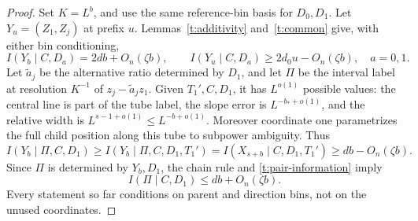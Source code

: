 \begin{proof}
Set $K=L^b$, and use the same reference-bin basis for $D_0,D_1$.
Let $Y_u=(Z_1,Z_j)$ at prefix $u$.  Lemmas~\ref{t:additivity}
and~\ref{t:common} give, with either bin conditioning,
\begin{equation}\label{t:pair-information}
 I(Y_b\mid C,D_a)=2db+O_n(\zeta b),\qquad
 I(Y_u\mid C,D_a)\ge2d_0u-O_n(\zeta b),\quad a=0,1.
\end{equation}
Let $\widetilde a_j$ be the alternative ratio determined by $D_1$,
and let $\Pi$ be the interval label at resolution $K^{-1}$ of
$z_j-\widetilde a_jz_1$.  Given $T_1',C,D_1$, it has $L^{o(1)}$
possible values: the central line is part of the tube label, the slope
error is $L^{-b_*+o(1)}$, and the relative width is
$L^{s-1+o(1)}\le L^{-b+o(1)}$.  Moreover coordinate one parametrizes
the full child position along this tube to subpower ambiguity.  Thus
\[
 I(Y_b\mid\Pi,C,D_1)
 \ge I(Y_b\mid\Pi,C,D_1,T_1')
 =I(X_{s+b}\mid C,D_1,T_1')
 \ge db-O_n(\zeta b).
\]
Since $\Pi$ is determined by $Y_b,D_1$, the chain rule and
\eqref{t:pair-information} imply
\begin{equation}\label{t:projection-information}
 I(\Pi\mid C,D_1)\le db+O_n(\zeta b).
\end{equation}
Every statement so far conditions on parent and direction bins, not
on the unused coordinates.


\end{proof}
